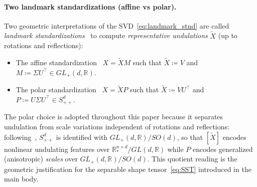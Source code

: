 \documentclass[pdflatex,iicol]{sn-jnl}%
\theoremstyle{thmstyleone}%
\theoremstyle{thmstyletwo}%
\theoremstyle{thmstylethree}%
\begin{document}
\begin{appendices}
\paragraph{Two landmark standardizations (affine vs polar).}
Two geometric interpretations of the SVD~\eqref{eq:landmark_stnd} are called \emph{landmark standardizations}~\cite{bryner20142d, grey2023separable, srivastava2016functional} to compute \textit{representative undulations} $\widetilde{X}$ (up to rotations and reflections):
\begin{itemize}
    \item The affine standardization~\cite{bryner20142d} $X = \widetilde{X}M$ such that
    $\widetilde{X} \coloneqq V$ and $ M \coloneqq \Sigma U^{\top} \in GL_+(d,\mathbb{R})$.
    \item The polar standardization~\cite{grey2023separable} $X = \widetilde{X}P$ such that
    $\widetilde{X} \coloneqq VU^{\top}$ and $P \coloneqq U\Sigma U^{\top}\in S^d_{++}$.
\end{itemize}
The polar choice is adopted throughout this paper because it separates undulation from scale variations independent of rotations and reflections: following~\cite{fletcher2003statistics}, $S^d_{++}$ is identified with $GL_+(d,\mathbb{R})/SO(d)$, so that $[\widetilde{X}]$ encodes nonlinear undulating features over $\mathbb{R}^{n \times d}_*/GL(d,\mathbb{R})$ while $P$ encodes generalized (anisotropic) \emph{scales} over $GL_+(d,\mathbb{R})/SO(d)$. This quotient reading is the geometric justification for the separable shape tensor~\eqref{eq:SST} introduced in the main body.


\end{appendices}
\end{document}
